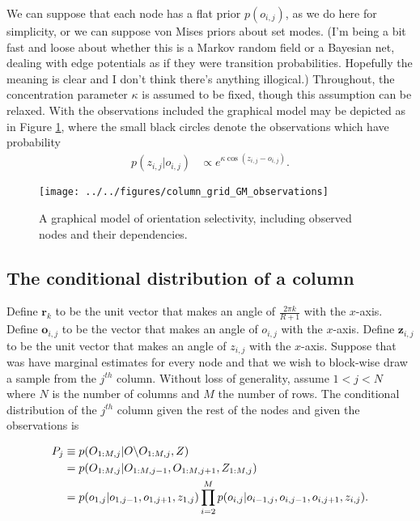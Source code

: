 \documentclass[11pt]{article}
\begin{document}
\noindent We can suppose that each node has a flat prior $p(o_{i,j})$, as we do here for simplicity, or we can suppose von Mises priors about set modes. (I'm being a bit fast and loose about whether this is a Markov random field or a Bayesian net, dealing with edge potentials as if they were transition probabilities. Hopefully the meaning is clear and I don't think there's anything illogical.) Throughout, the concentration parameter $\kappa$ is assumed to be fixed, though this assumption can be relaxed. With the observations included the graphical model may be depicted as in Figure \ref{fig:som_gm2}, where the small black circles denote the observations which have probability
%
\begin{align}
p(z_{i,j}|o_{i,j}) &\propto e^{\kappa \cos(z_{i,j}-o_{i,j})}.
\end{align}

\begin{figure}[h]
\centering
\texttt{[image: ../../figures/column\_grid\_GM\_observations]}
\caption{A graphical model of orientation selectivity, including observed nodes and their dependencies.}
\label{fig:som_gm2}
\end{figure}

\subsection{The conditional distribution of a column}

Define $\mathbf{r}_k$ to be the unit vector that makes an angle of $\frac{2\pi k}{R+1}$ with the $x$-axis. Define $\mathbf{o}_{i,j}$ to be the vector that makes an angle of $o_{i,j}$ with the $x$-axis. Define $\mathbf{z}_{i,j}$ to be the unit vector that makes an angle of $z_{i,j}$ with the $x$-axis. Suppose that was have marginal estimates for every node and that we wish to block-wise draw a sample from the $j^{th}$ column. Without loss of generality, assume $1<j<N$ where $N$ is the number of columns and $M$ the number of rows. The conditional distribution of the $j^{th}$ column given the rest of the nodes and given the observations is

\begin{align}
P_j &\equiv p(O_{1:M,j}|O\backslash O_{1:M,j},Z) \\
&= p(O_{1:M,j}|O_{1:M,j-1},O_{1:M,j+1},Z_{1:M,j}) \notag \\
&= p(o_{1,j}|o_{1,j-1},o_{1,j+1},z_{1,j}) \prod_{i=2}^M p(o_{i,j}|o_{i-1,j},o_{i,j-1},o_{i,j+1},z_{i,j}). \notag
\end{align}
\end{document}

